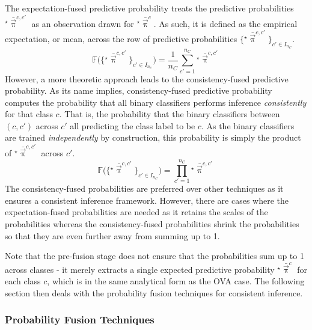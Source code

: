 				The expectation-fused predictive probability treats the predictive probabilities ${^{\star}}\bar{\vec{\uppi}}^{c, c'}$ as an observation drawn for ${^{\star}}\bar{\vec{\uppi}}^{c}$. As such, it is defined as the empirical expectation, or mean, across the row of predictive probabilities $\{{^{\star}}\bar{\vec{\uppi}}^{c, c'}\}_{c' \in I_{n_{C}}}$. \begin{equation}
					\mathbb{F}\Big(\{{^{\star}}\bar{\vec{\uppi}}^{c, c'}\}_{c' \in I_{n_{C}}}\Big) = \frac{1}{n_{C}}\sum_{c' = 1}^{n_{C}} {^{\star}}\bar{\vec{\uppi}}^{c, c'}
				\label{Equation:MeanFusionAVA2OVA}
				\end{equation} However, a more theoretic approach leads to the consistency-fused predictive probability. As its name implies, consistency-fused predictive probability computes the probability that all binary classifiers performs inference \textit{consistently} for that class $c$. That is, the probability that the binary classifiers between $(c, c')$ across $c'$ all predicting the class label to be $c$. As the binary classifiers are trained \textit{independently} by construction, this probability is simply the product of ${^{\star}}\bar{\vec{\uppi}}^{c, c'}$ across $c'$. \begin{equation}
					\mathbb{F}\Big(\{{^{\star}}\bar{\vec{\uppi}}^{c, c'}\}_{c' \in I_{n_{C}}}\Big) = \prod_{c' = 1}^{n_{C}} {^{\star}}\bar{\vec{\uppi}}^{c, c'}
				\label{Equation:ProdFusionAVA2OVA}
				\end{equation} The consistency-fused probabilities are preferred over other techniques as it ensures a consistent inference framework. However, there are cases where the expectation-fused probabilities are needed as it retains the scales of the probabilities whereas the consistency-fused probabilities shrink the probabilities so that they are even further away from summing up to 1.
				 
				Note that the pre-fusion stage does not ensure that the probabilities sum up to 1 across classes - it merely extracts a single expected predictive probability ${^{\star}}\bar{\vec{\uppi}}^{c}$ for each class $c$, which is in the same analytical form as the OVA case. The following section then deals with the probability fusion techniques for consistent inference.
			
			\subsubsection{Probability Fusion Techniques}
			\label{BenthicHabitatMapping:Classification:Multiclass:ProbabilityFusion}
				
